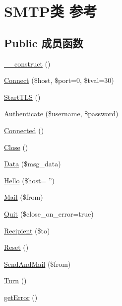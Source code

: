 \hypertarget{classSMTP}{\section{S\+M\+T\+P类 参考}
\label{classSMTP}
}
\subsection*{Public 成员函数}
\begin{DoxyCompactItemize}
\item 
\hyperlink{classSMTP_a943dd07e8b4b4f928b9aa71073939e0f}{\+\_\+\+\_\+construct} ()
\item 
\hyperlink{classSMTP_a8fba663a06f03ca0ffb142d5e4141235}{Connect} (\$host, \$port=0, \$tval=30)
\item 
\hyperlink{classSMTP_a98589ff1441c3c227f6ed12baee8d0cd}{Start\+T\+L\+S} ()
\item 
\hyperlink{classSMTP_a09bed676e22ceb5b30f4b90b0cb8a321}{Authenticate} (\$username, \$password)
\item 
\hyperlink{classSMTP_a1b04ed74ebc02d0e04ab61933ec7089e}{Connected} ()
\item 
\hyperlink{classSMTP_a6a46029fbb02a0bdf9f4680d95589f26}{Close} ()
\item 
\hyperlink{classSMTP_a19b1e3858b6474cace472f85e5dd75e4}{Data} (\$msg\+\_\+data)
\item 
\hyperlink{classSMTP_a497ea40eb9c62b103228a1a4e3b3cdbd}{Hello} (\$host= '')
\item 
\hyperlink{classSMTP_ab1377e8100ab85ecd152992dbcff1990}{Mail} (\$from)
\item 
\hyperlink{classSMTP_a8d7a8c08be60eee2fdb11ace4577eae4}{Quit} (\$close\+\_\+on\+\_\+error=true)
\item 
\hyperlink{classSMTP_abad67dffc11da60d8be10bc1282d8107}{Recipient} (\$to)
\item 
\hyperlink{classSMTP_a32288c4664c4da18c2bde09c558527c3}{Reset} ()
\item 
\hyperlink{classSMTP_adf346869f30d1f09f5437cd0e039f2ca}{Send\+And\+Mail} (\$from)
\item 
\hyperlink{classSMTP_a00e2009833692aa235de5c26b835adc5}{Turn} ()
\item 
\hyperlink{classSMTP_ae69932e8666ab3e15c22ea4d9f03909f}{get\+Error} ()
\end{DoxyCompactItemize}

